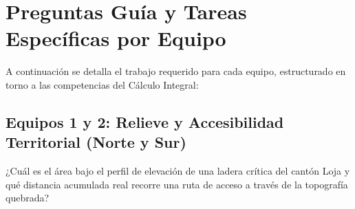 \documentclass[11pt,a4paper]{article}
\begin{document}
\section{Preguntas Guía y Tareas Específicas por Equipo}

A continuación se detalla el trabajo requerido para cada equipo, estructurado en torno a las competencias del Cálculo Integral:

\subsection{Equipos 1 y 2: Relieve y Accesibilidad Territorial (Norte y Sur)}
\begin{guidelinebox}[title=Pregunta Guía Central]
¿Cuál es el área bajo el perfil de elevación de una ladera crítica del cantón Loja y qué distancia acumulada real recorre una ruta de acceso a través de la topografía quebrada?
\end{guidelinebox}
\end{document}
